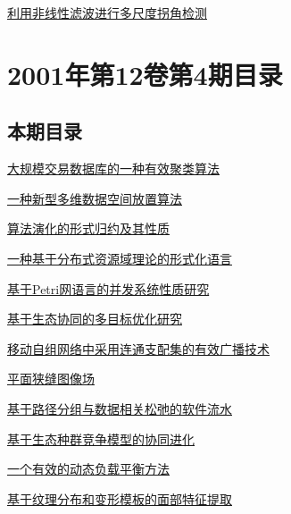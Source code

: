 \documentclass[a4paper]{article}
\begin{document}
\href{http://www.jos.org.cn/ch/reader/download_pdf.aspx?file_no=20010520&year_id=2001&quarter_id=5&falg=1}{利用非线性滤波进行多尺度拐角检测}


\section{\textbf{2001年第12卷第4期目录}}
\subsection{本期目录}
\href{http://www.jos.org.cn/ch/reader/download_pdf.aspx?file_no=20010401&year_id=2001&quarter_id=4&falg=1}{大规模交易数据库的一种有效聚类算法}

\href{http://www.jos.org.cn/ch/reader/download_pdf.aspx?file_no=20010402&year_id=2001&quarter_id=4&falg=1}{一种新型多维数据空间放置算法}

\href{http://www.jos.org.cn/ch/reader/download_pdf.aspx?file_no=20010403&year_id=2001&quarter_id=4&falg=1}{算法演化的形式归约及其性质}

\href{http://www.jos.org.cn/ch/reader/download_pdf.aspx?file_no=20010404&year_id=2001&quarter_id=4&falg=1}{一种基于分布式资源域理论的形式化语言}

\href{http://www.jos.org.cn/ch/reader/download_pdf.aspx?file_no=20010405&year_id=2001&quarter_id=4&falg=1}{基于Petri网语言的并发系统性质研究}

\href{http://www.jos.org.cn/ch/reader/download_pdf.aspx?file_no=20010406&year_id=2001&quarter_id=4&falg=1}{基于生态协同的多目标优化研究}

\href{http://www.jos.org.cn/ch/reader/download_pdf.aspx?file_no=20010407&year_id=2001&quarter_id=4&falg=1}{移动自组网络中采用连通支配集的有效广播技术}

\href{http://www.jos.org.cn/ch/reader/download_pdf.aspx?file_no=20010408&year_id=2001&quarter_id=4&falg=1}{平面狭缝图像场}

\href{http://www.jos.org.cn/ch/reader/download_pdf.aspx?file_no=20010409&year_id=2001&quarter_id=4&falg=1}{基于路径分组与数据相关松弛的软件流水}

\href{http://www.jos.org.cn/ch/reader/download_pdf.aspx?file_no=20010410&year_id=2001&quarter_id=4&falg=1}{基于生态种群竞争模型的协同进化}

\href{http://www.jos.org.cn/ch/reader/download_pdf.aspx?file_no=20010411&year_id=2001&quarter_id=4&falg=1}{一个有效的动态负载平衡方法}

\href{http://www.jos.org.cn/ch/reader/download_pdf.aspx?file_no=20010412&year_id=2001&quarter_id=4&falg=1}{基于纹理分布和变形模板的面部特征提取}
\end{document}
